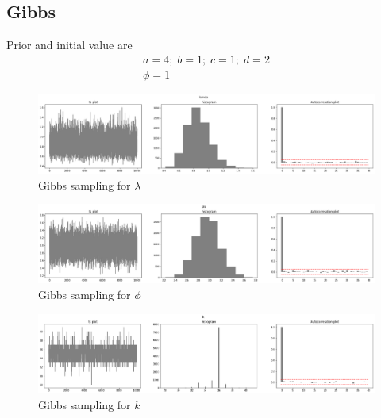 \documentclass[11pt]{article}
\begin{document}
	\subsection{Gibbs}
	Prior and initial value are
	\begin{align*}
	a = 4;\;
	b = 1;\;
	c = 1;\;
	d = 2\\
	\phi = 1
	\end{align*}
	
	\begin{figure}
		\centering
		\includegraphics[width=1\linewidth]{gibbslam}
		\caption{Gibbs sampling for $\lambda$}
		\label{fig:gibbslam}
	\end{figure}
	\begin{figure}
		\centering
		\includegraphics[width=1\linewidth]{gibbspi}
		\caption{Gibbs sampling for $\phi$}
		\label{fig:gibbspi}
	\end{figure}
	
	\begin{figure}
		\centering
		\includegraphics[width=1\linewidth]{gibbsk}
		\caption{Gibbs sampling for $k$}
		\label{fig:gibbsk}
	\end{figure}
\end{document}

